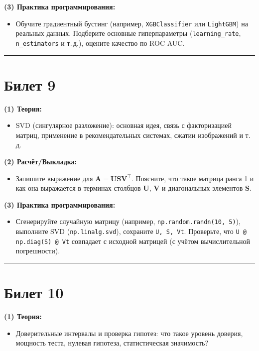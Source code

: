 \documentclass[a4paper,12pt]{article}
\begin{document}
\textbf{(3) Практика программирования:}
\begin{itemize}
  \item Обучите градиентный бустинг (например, \texttt{XGBClassifier} или \texttt{LightGBM}) на реальных данных. Подберите основные гиперпараметры (\texttt{learning\_rate}, \texttt{n\_estimators} и т.\,д.), оцените качество по ROC AUC.
\end{itemize}

\noindent\rule{\textwidth}{0.4pt}
\newpage

\section*{Билет 9}
\textbf{(1) Теория:}
\begin{itemize}
  \item SVD (сингулярное разложение): основная идея, связь с факторизацией матриц, применение в рекомендательных системах, сжатии изображений и т.\,д.
\end{itemize}

\textbf{(2) Расчёт/Выкладка:}
\begin{itemize}
  \item Запишите выражение для $\mathbf{A} = \mathbf{U}\mathbf{S}\mathbf{V}^\top$. Поясните, что такое матрица ранга 1 и как она выражается в терминах столбцов $\mathbf{U}$, $\mathbf{V}$ и диагональных элементов $\mathbf{S}$.
\end{itemize}

\textbf{(3) Практика программирования:}
\begin{itemize}
  \item Сгенерируйте случайную матрицу (например, \texttt{np.random.randn(10, 5)}), выполните SVD (\texttt{np.linalg.svd}), сохраните \texttt{U, S, Vt}. Проверьте, что \texttt{U @ np.diag(S) @ Vt} совпадает с исходной матрицей (с учётом вычислительной погрешности).
\end{itemize}

\noindent\rule{\textwidth}{0.4pt}
\newpage

\section*{Билет 10}
\textbf{(1) Теория:}
\begin{itemize}
  \item Доверительные интервалы и проверка гипотез: что такое уровень доверия, мощность теста, нулевая гипотеза, статистическая значимость?
\end{itemize}
\end{document}
